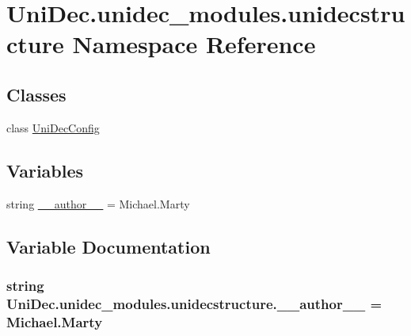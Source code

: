 \hypertarget{namespace_uni_dec_1_1unidec__modules_1_1unidecstructure}{}\section{Uni\+Dec.\+unidec\+\_\+modules.\+unidecstructure Namespace Reference}
\label{namespace_uni_dec_1_1unidec__modules_1_1unidecstructure}
\subsection*{Classes}
\begin{DoxyCompactItemize}
\item 
class \hyperlink{class_uni_dec_1_1unidec__modules_1_1unidecstructure_1_1_uni_dec_config}{Uni\+Dec\+Config}
\end{DoxyCompactItemize}
\subsection*{Variables}
\begin{DoxyCompactItemize}
\item 
string \hyperlink{namespace_uni_dec_1_1unidec__modules_1_1unidecstructure_acc46ba3b55df641dbdf985ed5bc94ec0}{\+\_\+\+\_\+author\+\_\+\+\_\+} = \textquotesingle{}Michael.\+Marty\textquotesingle{}
\end{DoxyCompactItemize}


\subsection{Variable Documentation}
\hypertarget{namespace_uni_dec_1_1unidec__modules_1_1unidecstructure_acc46ba3b55df641dbdf985ed5bc94ec0}{}
\subsubsection[{\+\_\+\+\_\+author\+\_\+\+\_\+}]{\setlength{\rightskip}{0pt plus 5cm}string Uni\+Dec.\+unidec\+\_\+modules.\+unidecstructure.\+\_\+\+\_\+author\+\_\+\+\_\+ = \textquotesingle{}Michael.\+Marty\textquotesingle{}}\label{namespace_uni_dec_1_1unidec__modules_1_1unidecstructure_acc46ba3b55df641dbdf985ed5bc94ec0}
